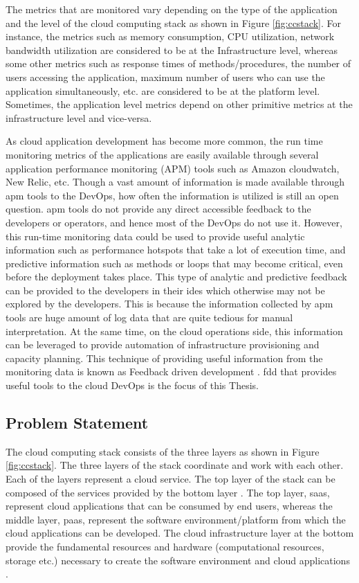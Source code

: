 \documentclass[article,type=msc,colorback,12pt,accentcolor=tud8b,table]{tudthesis}
\begin{document}
	\par The metrics that are monitored vary depending on the type of the application and the level of the cloud computing stack as shown in Figure \ref{fig:ccstack}. For instance, the metrics such as memory consumption, CPU utilization, network bandwidth utilization are considered to be at the Infrastructure level, whereas some other metrics such as response times of methods/procedures, the number of users accessing the application, maximum number of users who can use the application simultaneously, etc. are considered to be at the platform level. Sometimes, the application level metrics depend on other primitive metrics at the infrastructure level and vice-versa.
	
	\par As cloud application development has become more common, the run time monitoring metrics of the applications are easily available through several application performance monitoring (APM) tools such as Amazon cloudwatch, New Relic, etc. Though a vast amount of information is made available through \gls{apm} tools to the DevOps, how often the information is utilized is still an open question. \gls{apm} tools do not provide any direct accessible feedback to the developers or operators, and hence most of the DevOps do not use it. However, this run-time monitoring data could be used to provide useful analytic information such as performance hotspots that take a lot of execution time, and predictive information such as methods or loops that may become critical, even before the deployment takes place. This type of analytic and predictive feedback can be provided to the developers in their \gls{ide}s which otherwise may not be explored by the developers. This is because the information collected by \gls{apm} tools are huge amount of log data that are quite tedious for manual interpretation. At the same time, on the cloud operations side, this information can be leveraged to provide automation of infrastructure provisioning and capacity planning. This technique of providing useful information from the monitoring data is known as Feedback driven development \cite{cito2015runtime}. \gls{fdd} that provides useful tools to the cloud DevOps is the focus of this Thesis.	
	
	\subsection{Problem Statement}	
	
The cloud computing stack consists of the three layers as shown in Figure \ref{fig:ccstack}. The three layers of the stack coordinate and work with each other. Each of the layers represent a cloud service. The top layer of the stack can be composed of the services provided by the bottom layer \cite{youseff2008toward}. The top layer, \gls{saas}, represent cloud applications that can be consumed by end users, whereas the middle layer, \gls{paas}, represent the software environment/platform from which the cloud applications can be developed. The cloud infrastructure layer at the bottom provide the fundamental resources and hardware (computational resources, storage etc.) necessary to create the software environment and cloud applications \cite{youseff2008toward}.  
\end{document}
